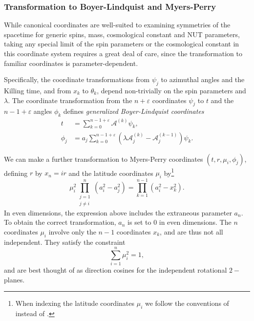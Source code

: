 \subsubsection{Transformation to Boyer-Lindquist and Myers-Perry}
While canonical coordinates are well-suited to examining symmetries of the spacetime for
generic spins, mass, cosmological constant and NUT parameters, taking any special limit of
the spin parameters or the cosmological constant in this coordinate system requires a
great deal of care, since the transformation to familiar coordinates is parameter-dependent.

Specifically, the coordinate transformations from $\psi_{j}$ to azimuthal angles and the Killing time, and from
$x_{k}$ to $\theta_{k}$, depend non-trivially on the spin parameters and $\lambda$.
%
The coordinate transformation from the $n + \varepsilon $ coordinates $\psi_{j}$ to $t$ and the $n-1+\varepsilon$
angles $\phi_{k}$ defines \emph{generalized Boyer-Lindquist coordinates}
\cite{Frolov:2017kze}
\begin{equation} \label{5D:TransformAzimuthalAnglesFromCanonicalToMyersPerry} 
    \begin{split}
        t &= \sum_{k = 0}^{n - 1 + \varepsilon} \mathcal{A}^{(k)} \psi_{k}, \\
        \phi_{j} &= a_{j} \sum_{k = 0}^{n - 1 + \varepsilon} \left( \lambda
        \mathcal{A}_{j}^{(k)} - \mathcal{A}_{j}^{(k-1)}\right) \psi_{k}.
    \end{split}
\end{equation}
%

We can make a further transformation to
Myers-Perry coordinates $(t, r, \mu_{i}, \phi_{j})$, defining $r$ by $x_{n} = ir$ and the latitude coordinates
$\mu_{i}$ by\footnote{When indexing the latitude coordinates $\mu_{i}$ we follow the conventions of \cite{Chen:2006xh} instead
of \cite{Frolov:2017kze}.} 
%
\begin{equation} 
    \mu_{i}^{2} \prod_{ \substack{j
            = 1 \\ j\neq i}}^{n}(a_{i}^{2} - a_{j}^{2})  =  \prod_{k = 1}^{n - 1} (a_{i}^{2} - x_{k}^{2}).
\end{equation}
%
In even dimensions, the expression above includes the extraneous parameter $a_{n}$. To
obtain the correct transformation, $a_{n}$ is set to $0$ in even dimensions.
The $n$ coordinates $\mu_{i}$ involve only the $n-1$ coordinates $x_{k}$,
and are thus not all independent. They satisfy the constraint
\begin{equation}
    \sum_{i = 1}^{n} \mu_{i}^{2} = 1,
\end{equation}
and are best thought of as direction cosines for the independent rotational $2-$planes.

